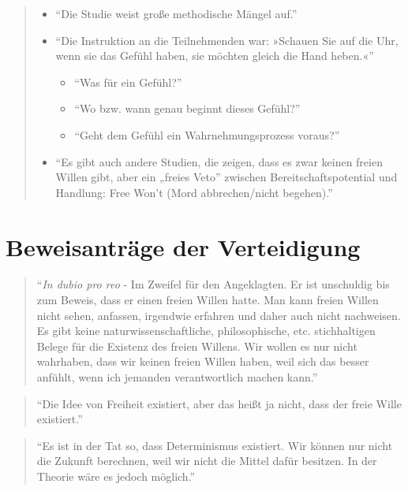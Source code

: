 \documentclass[
  a4paper,
]{report}
\begin{document}
\begin{quote}
\begin{itemize}
\item
  ``Die Studie weist große methodische Mängel auf.''
\item
  ``Die Instruktion an die Teilnehmenden war: »Schauen Sie auf die Uhr, wenn sie das Gefühl haben, sie möchten gleich die Hand heben.«''

  \begin{itemize}
  \item
    ``Was für ein Gefühl?''
  \item
    ``Wo bzw. wann genau beginnt dieses Gefühl?''
  \item
    ``Geht dem Gefühl ein Wahrnehmungsprozess voraus?''
  \end{itemize}
\item
  ``Es gibt auch andere Studien, die zeigen, dass es zwar keinen freien Willen gibt, aber ein „freies Veto'' zwischen Bereitschaftspotential und Handlung: Free Won't (Mord abbrechen/nicht begehen).''
\end{itemize}
\end{quote}

\hypertarget{def-ev}{%
\section{\texorpdfstring{\textbf{Beweisanträge der} Verteidigung}{Beweisanträge der Verteidigung}}\label{def-ev}}

\begin{quote}
``\emph{In dubio pro reo} - Im Zweifel für den Angeklagten. Er ist unschuldig bis zum Beweis, dass er einen freien Willen hatte. Man kann freien Willen nicht sehen, anfassen, irgendwie erfahren und daher auch nicht nachweisen. Es gibt keine naturwissenschaftliche, philosophische, etc. stichhaltigen Belege für die Existenz des freien Willens. Wir wollen es nur nicht wahrhaben, dass wir keinen freien Willen haben, weil sich das besser anfühlt, wenn ich jemanden verantwortlich machen kann.''
\end{quote}

\begin{quote}
``Die Idee von Freiheit existiert, aber das heißt ja nicht, dass der freie Wille existiert.''
\end{quote}

\begin{quote}
``Es ist in der Tat so, dass Determinismus existiert. Wir können nur nicht die Zukunft berechnen, weil wir nicht die Mittel dafür besitzen. In der Theorie wäre es jedoch möglich.''
\end{quote}
\end{document}
